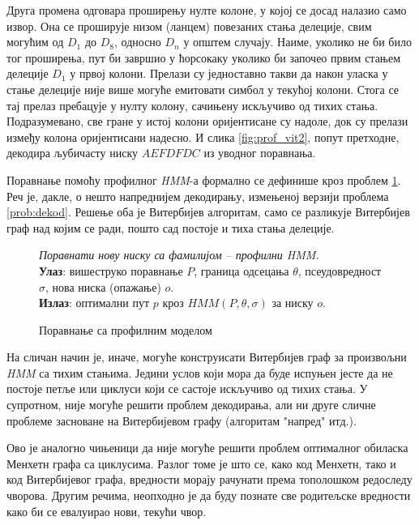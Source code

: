 \documentclass[12pt,oneside]{memoir}
\newenvironment{problem}[1][!ht]
{\renewcommand{\algorithmcfname}{Проблем}
\begin{figure}[!ht]
\centering
  \begin{minipage}{.94\linewidth}
	\begin{algorithm}[#1]%
  }{\end{algorithm}
  \end{minipage}
\end{figure}}
\begin{document}
\begin{CJK}{UTF8}{ipxm}
Друга промена одговара проширењу нулте колоне, у којој се досад налазио само извор. Она се проширује низом (ланцем) повезаних стања делеције, свим могућим од $D_1$ до $D_8$, односно $D_n$ у општем случају. Наиме, уколико не би било тог проширења, пут би завршио у ћорсокаку уколико би започео првим стањем делеције $D_1$ у првој колони. Прелази су једноставно такви да након уласка у стање делеције није више могуће емитовати симбол у текућој колони. Стога се тај прелаз пребацује у нулту колону, сачињену искључиво од тихих стања. Подразумевано, све гране у истој колони оријентисане су надоле, док су прелази између колона оријентисани надесно. И слика \ref{fig:prof_vit2}, попут претходне, декодира љубичасту ниску $AEFDFDC$ из уводног поравнања.

Поравнање помоћу профилног \textit{HMM}-а формално се дефинише кроз проблем \ref{prob:poravnanje}. Реч је, дакле, о нешто напреднијем декодирању, измењеној верзији проблема \ref{prob:dekod}. Решење оба је Витербијев алгоритам, само се разликује Витербијев граф над којим се ради, пошто сад постоје и тиха стања делеције.

\begin{problem}[H]
  \SetAlgoLined
  \textit{Поравнати нову ниску са фамилијом -- профилни \textit{HMM}.}\\
  \textbf{Улаз}: вишеструко поравнање $P$, граница одсецања $\theta$, псеудовредност $\sigma$, нова ниска (опажање) $o$.\\
  \textbf{Излаз}: оптимални пут $p$ кроз $HMM(P, \theta, \sigma)$ за ниску $o$.
  \caption[]{Поравнање са профилним моделом\footnotemark}
  \label{prob:poravnanje}
\end{problem}


На сличан начин је, иначе, могуће конструисати Витербијев граф за произвољни \textit{HMM} са тихим стањима. Једини услов који мора да буде испуњен јесте да не постоје петље или циклуси који се састоје искључиво од тихих стања. У супротном, није могуће решити проблем декодирања, али ни друге сличне проблеме засноване на Витербијевом графу (алгоритам "напред" итд.).

Ово је аналогно чињеници да није могуће решити проблем оптималног обиласка Менхетн графа са циклусима. Разлог томе је што се, како код Менхетн, тако и код Витербијевог графа, вредности морају рачунати према тополошком редоследу чворова. Другим речима, неопходно је да буду познате све родитељске вредности како би се евалуирао нови, текући чвор.


\end{CJK}
\end{document}
